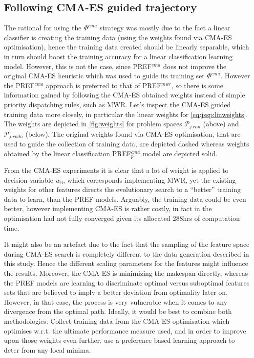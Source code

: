 \documentclass[smallextended]{llncs}
\newcommand{\PREF}[2]{PREF$_{#2}^{#1}$}
\begin{document}
\subsection{Following CMA-ES guided trajectory}\label{sec:expr:cmaes}
The rational for using the $\Phi^{cma}$ strategy was mostly due to the fact a linear classifier is creating the training data (using the weights found via CMA-ES optimisation), hence the training data created should be linearly separable, which in turn should boost the training accuracy for a linear classification learning model. However, this is not the case, since \PREF{cma}{} does not improve the original CMA-ES heuristic which 
was used to guide its training set $\Phi^{cma}$. However the \PREF{cma}{} approach is preferred to that of \PREF{mwr}{}, so there is some information gained by following the CMA-ES obtained weights instead of simple priority dispatching rules, such as MWR. 
%
Let's inspect the CMA-ES guided training data more closely, in particular the linear weights for \cref{eq:jssp:linweights}. The weights are depicted in \cref{fig:weights} for problem spaces $\mathcal{P}_{j.rnd}$ (above) and $\mathcal{P}_{j.rndn}$ (below). The original weights found via CMA-ES optimisation, that are used to guide the collection of training data, are depicted dashed whereas weights obtained by the linear classification \PREF{cma}{p} model are depicted solid. 

From the CMA-ES experiments it is clear that a lot of weight is applied to decision variable $w_6$, which corresponds implementing MWR, yet the existing weights for other features directs the evolutionary search to a ``better'' training data to learn, than the PREF models. Arguably, the training data could be even better, however implementing CMA-ES is rather costly, in fact in \cite{InRu14a} the optimisation had not fully converged given its allocated 288hrs of computation time.

It might also be an artefact due to the fact that the sampling of the feature space during CMA-ES search is completely different to the data generation described in this study. Hence the different scaling parameters for the features might influence the results. Moreover, the CMA-ES is minimizing the makespan directly, whereas the PREF models are learning to discriminate optimal versus suboptimal features sets that  are believed to imply a better deviation from optimality later on. However, in that case, the process is very vulnerable when it comes to any divergence from the optimal path. 
Ideally,  it would be best to combine both methodologies: Collect training data from the CMA-ES optimisation which optimises w.r.t. the ultimate performance measure used, and in order to improve upon those weights even further, use a preference based learning approach to deter from any local minima. 
\end{document}
